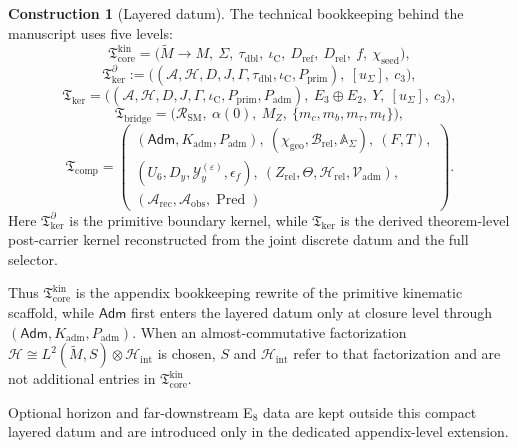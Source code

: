 \documentclass[11pt,a4paper]{article}
\theoremstyle{definition}
\newtheorem{construction}[theorem]{Construction}
\theoremstyle{remark}
\newcommand{\Seam}{\Sigma}
\newcommand{\taudbl}{\tau_{\mathrm{dbl}}}
\newcommand{\iC}{\iota_{\mathrm C}}
\newcommand{\cthree}{c_3}
\newcommand{\SM}{\mathrm{SM}}
\newcommand{\Arec}{\mathcal A_{\mathrm{rec}}}
\newcommand{\Aobs}{\mathcal A_{\mathrm{obs}}}
\newcommand{\Vadm}{\mathcal V_{\mathrm{adm}}}
\newcommand{\Hrel}{\mathcal H_{\mathrm{rel}}}
\newcommand{\Pred}{\operatorname{Pred}}
\newcommand{\Hint}{\mathcal H_{\mathrm{int}}}
\newcommand{\Kadm}{K_{\mathrm{adm}}}
\newcommand{\chiseed}{\chi_{\mathrm{seed}}}
\newcommand{\chigeo}{\chi_{\mathrm{geo}}}
\newcommand{\Tcore}{\mathfrak T_{\mathrm{core}}}
\newcommand{\Tbridge}{\mathfrak T_{\mathrm{bridge}}}
\newcommand{\Tker}{\mathfrak T_{\mathrm{ker}}}
\newcommand{\Tcomp}{\mathfrak T_{\mathrm{comp}}}
\newcommand{\Padm}{P_{\mathrm{adm}}}
\newcommand{\Pprim}{P_{\mathrm{prim}}}
\begin{document}
\begin{construction}[Layered datum]
The technical bookkeeping behind the manuscript uses five levels:
\[
\Tcore^{\mathrm{kin}}
=
\bigl(
\widetilde M\to M,\ \Seam,\ \taudbl,\ \iC,\ D_{\mathrm{ref}},\ D_{\mathrm{rel}},\ f,\ \chiseed
\bigr),
\]
\[
\Tker^\partial
:=
\bigl(
(\mathcal A,\mathcal H,D,J,\Gamma,\taudbl,\iC,\Pprim),\ [u_\Sigma],\ \cthree
\bigr),
\]
\[
\Tker
=
\bigl(
(\mathcal A,\mathcal H,D,J,\Gamma,\iC,\Pprim,\Padm),\ E_3\oplus E_2,\ Y,\ [u_\Sigma],\ \cthree
\bigr),
\]
\[
\Tbridge
=
\bigl(
\mathcal R_{\SM},\ \alpha(0),\ M_Z,\ \{m_c,m_b,m_\tau,m_t\}
\bigr),
\]
\[
\Tcomp
=
\left(
\begin{array}{l}
(\mathsf{Adm},\Kadm,\Padm),\ (\chigeo,\mathcal B_{\mathrm{rel}},\mathbb A_{\Seam}),\ (F,T),\\
(U_6,D_y,\mathcal Y_y^{(\varepsilon)},\epsilon_f),\ (Z_{\mathrm{rel}},\Theta,\Hrel,\Vadm),\\
(\Arec,\Aobs,\Pred)
\end{array}
\right).
\]
Here $\Tker^\partial$ is the primitive boundary kernel, while $\Tker$ is the derived theorem-level
post-carrier kernel reconstructed from the joint discrete datum and the full selector.
\end{construction}

Thus $\Tcore^{\mathrm{kin}}$ is the appendix bookkeeping rewrite of the primitive kinematic
scaffold, while $\mathsf{Adm}$ first enters the layered datum only at closure level through
$(\mathsf{Adm},\Kadm,\Padm)$. When an almost-commutative factorization
$\mathcal H\cong L^2(\widetilde M,S)\otimes\Hint$ is chosen, $S$ and $\Hint$ refer to that
factorization and are not additional entries in $\Tcore^{\mathrm{kin}}$.

Optional horizon and far-downstream E$_8$ data are kept outside this compact layered datum and are introduced only in the dedicated appendix-level extension.
\end{document}
